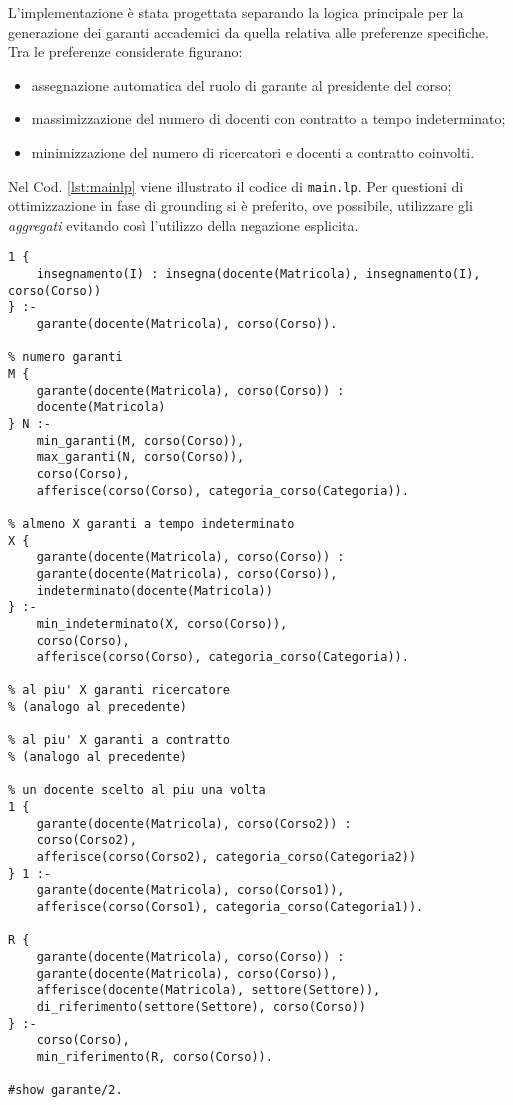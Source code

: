 \documentclass[journal]{IEEEtran}
\begin{document}
L'implementazione è stata progettata separando la logica principale per la
generazione dei garanti accademici da quella relativa alle preferenze
specifiche. Tra le preferenze considerate figurano:  \begin{itemize} \item
	assegnazione automatica del ruolo di garante al presidente del corso;  \item
massimizzazione del numero di docenti con contratto a tempo indeterminato;
\item minimizzazione del numero di ricercatori e docenti a contratto coinvolti.
\end{itemize}

Nel Cod. \ref{lst:mainlp} viene illustrato il codice di \texttt{main.lp}. Per
questioni di ottimizzazione in fase di grounding si è preferito, ove possibile, utilizzare gli
\textit{aggregati} evitando così l'utilizzo della negazione esplicita.

\begin{center}
\begin{lstlisting}[style=asp, caption={Codice ASP del file \texttt{main.lp}.}, label={lst:mainlp}]
% se garante allora insegna almeno una materia
1 {
    insegnamento(I) : insegna(docente(Matricola), insegnamento(I), corso(Corso))
} :-
    garante(docente(Matricola), corso(Corso)).

% numero garanti
M {
    garante(docente(Matricola), corso(Corso)) :
    docente(Matricola)
} N :-
    min_garanti(M, corso(Corso)),
    max_garanti(N, corso(Corso)),
    corso(Corso),
    afferisce(corso(Corso), categoria_corso(Categoria)).

% almeno X garanti a tempo indeterminato
X {
    garante(docente(Matricola), corso(Corso)) :
    garante(docente(Matricola), corso(Corso)),
    indeterminato(docente(Matricola))
} :-
    min_indeterminato(X, corso(Corso)),
    corso(Corso),
    afferisce(corso(Corso), categoria_corso(Categoria)).

% al piu' X garanti ricercatore
% (analogo al precedente)

% al piu' X garanti a contratto
% (analogo al precedente)

% un docente scelto al piu una volta
1 {
    garante(docente(Matricola), corso(Corso2)) :
    corso(Corso2),
    afferisce(corso(Corso2), categoria_corso(Categoria2))
} 1 :-
    garante(docente(Matricola), corso(Corso1)),
    afferisce(corso(Corso1), categoria_corso(Categoria1)).

R {
    garante(docente(Matricola), corso(Corso)) :
    garante(docente(Matricola), corso(Corso)),
    afferisce(docente(Matricola), settore(Settore)),
    di_riferimento(settore(Settore), corso(Corso))
} :-
    corso(Corso),
    min_riferimento(R, corso(Corso)).

#show garante/2.
\end{lstlisting}
\end{center}
\end{document}
